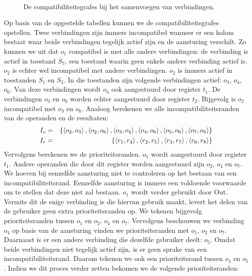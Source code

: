 \paragraph{}
\begin{figure}[hbt]
\centering
{}
\caption{De compatibiliteitsgrafes bij het samenvoegen van verbindingen.}
\end{figure}
Op basis van de opgestelde tabellen kunnen we de compatibiliteitsgrafes opstellen. Twee verbindingen zijn immers incompatibel wanneer er een kolom bestaat waar beide verbindingen tegelijk actief zijn en de aansturing verschilt. Zo kunnen we uit  dat $o_1$ compatibel is met alle andere verbindingen: de verbinding is actief in toestand $S_7$, een toestand waarin geen enkele andere verbinding actief is. $o_2$ is echter wel incompatibel met andere verbindingen. $o_2$ is immers actief in toestanden $S_1$ en $S_2$. In die toestanden zijn volgende verbindingen actief: $o_3$, $o_4$, $o_6$. Van deze verbindingen wordt $o_4$ ook aangestuurd door register $t_1$. De verbindingen $o_3$ en $o_6$ worden echter aangestuurd door register $t_2$. Bijgevolg is $o_2$ incompatibel met $o_3$ en $o_6$.  Analoog berekenen we alle incompatibiliteitsranden van de operanden en de resultaten:
\begin{eqnarray}
I_o&=&\left\{ \left\langle o_2,o_3 \right\rangle,\left\langle o_2,o_6 \right\rangle,\left\langle o_3,o_4 \right\rangle,\left\langle o_4,o_6 \right\rangle,\left\langle o_5,o_6 \right\rangle,\left\langle o_7,o_8 \right\rangle \right\}\\
I_r&=&\left\{ \left\langle r_1,r_4 \right\rangle,\left\langle r_2,r_5 \right\rangle,\left\langle r_3,r_7 \right\rangle,\left\langle r_6,r_8 \right\rangle \right\}
\end{eqnarray}
Vervolgens berekenen we de prioriteitsranden. $o_1$ wordt aangestuurd door register $t_1$. Andere operanden die door dit register worden aangestuurd zijn $o_2$, $o_4$ en $o_7$. We hoeven bij eenzelfde aansturing niet te controleren op het bestaan van een incompatibiliteitsrand. Eenzelfde aansturing is immers een voldoende voorwaarde om te stellen dat deze niet zal bestaan. $o_1$ wordt verder gebruikt door \mbox{Out}. Vermits dit de enige verbinding is die hiervan gebruik maakt, levert het delen van de gebruiker geen extra prioriteitsranden op. We tekenen bijgevolg prioriteitsranden tussen $o_1$ en $o_2$, $o_4$ en $o_7$. Vervolgens beschouwen we verbinding $o_4$ op basis van de aansturing vinden we prioriteitsranden met $o_1$, $o_2$ en $o_7$. Daarnaast is er een andere verbinding die dezelfde gebruiker deelt: $o_5$. Omdat beide verbindingen niet tegelijk actief zijn, is er geen sprake van een incompatibiliteitsrand. Daarom tekenen we ook een prioriteitsrand tussen $o_4$ en $o_5$. Indien we dit proces verder zetten bekomen we de volgende prioriteitsranden:
